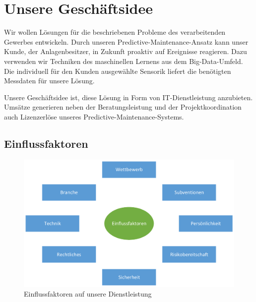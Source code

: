 \section{Unsere Geschäftsidee}
Wir wollen Lösungen für die beschriebenen Probleme des verarbeitenden Gewerbes entwickeln. Durch unseren Predictive-Maintenance-Ansatz kann unser Kunde, der Anlagenbesitzer, in Zukunft proaktiv auf Ereignisse reagieren. Dazu verwenden wir Techniken des maschinellen Lernens aus dem Big-Data-Umfeld. Die individuell für den Kunden ausgewählte Sensorik liefert die benötigten Messdaten für unsere Lösung. 

Unsere Geschäftsidee ist, diese Lösung in Form von IT-Dienstleistung anzubieten. Umsätze generieren neben der Beratungsleistung und der Projektkoordination auch Lizenzerlöse unseres Predictive-Maintenance-Systems.

\subsection{Einflussfaktoren}
\begin{figure}[H]
\centering
\includegraphics[width=0.9\linewidth]{Bilder/Einflussfaktoren}
\caption{Einflussfaktoren auf unsere Dienstleistung}
\label{fig:Einflussfaktoren}
\end{figure}

